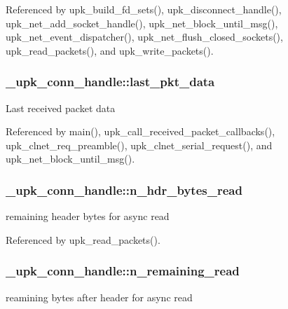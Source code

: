 Referenced by upk\_\-build\_\-fd\_\-sets(), upk\_\-disconnect\_\-handle(), upk\_\-net\_\-add\_\-socket\_\-handle(), upk\_\-net\_\-block\_\-until\_\-msg(), upk\_\-net\_\-event\_\-dispatcher(), upk\_\-net\_\-flush\_\-closed\_\-sockets(), upk\_\-read\_\-packets(), and upk\_\-write\_\-packets().

\subsubsection[{last\_\-pkt\_\-data}]{ {\bf \_\-upk\_\-conn\_\-handle::last\_\-pkt\_\-data}}\label{struct__upk__conn__handle_a710dc65b81c7f60848d8b820fa74a827}
Last received packet data 

Referenced by main(), upk\_\-call\_\-received\_\-packet\_\-callbacks(), upk\_\-clnet\_\-req\_\-preamble(), upk\_\-clnet\_\-serial\_\-request(), and upk\_\-net\_\-block\_\-until\_\-msg().

\subsubsection[{n\_\-hdr\_\-bytes\_\-read}]{ {\bf \_\-upk\_\-conn\_\-handle::n\_\-hdr\_\-bytes\_\-read}}\label{struct__upk__conn__handle_a9d01770138bb94d0e060929a635cd71d}
remaining header bytes for async read 

Referenced by upk\_\-read\_\-packets().

\subsubsection[{n\_\-remaining\_\-read}]{ {\bf \_\-upk\_\-conn\_\-handle::n\_\-remaining\_\-read}}\label{struct__upk__conn__handle_a2fc49e5a769b39f8522a33a738d8bfff}
reamining bytes after header for async read 

